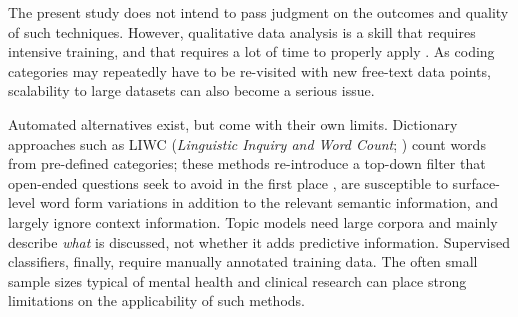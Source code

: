 \documentclass[man,floatsintext]{apa7}
\newcommand{\change}[1]{#1}
\begin{document}
The present study does not intend to pass judgment on the outcomes and quality of such techniques. However, qualitative data analysis is a skill that requires intensive training, and that requires a lot of time to properly apply \parencite{braun2006using,oconnor2020intercoder}. As coding categories may repeatedly have to be re-visited with new free-text data points, scalability to large datasets can also become a serious issue. 

\change{Automated alternatives exist, but come with their own limits. Dictionary approaches such as LIWC (\emph{Linguistic Inquiry and Word Count}; \cite{tausczik2010psychological,boyd2021natural}) count words from pre-defined categories; these methods re-introduce a top-down filter that open-ended questions seek to avoid in the first place \parencite{schwartz2013personality}, are susceptible to surface-level word form variations in addition to the relevant semantic information, and largely ignore context information. Topic models \parencite{Blei2003,roberts2014structural} need large corpora and mainly describe \emph{what} is discussed, not whether it adds predictive information. Supervised classifiers, finally, require manually annotated training data. The often small sample sizes typical of \change{mental health and clinical research} can place strong limitations on the applicability of such methods.}
\end{document}
